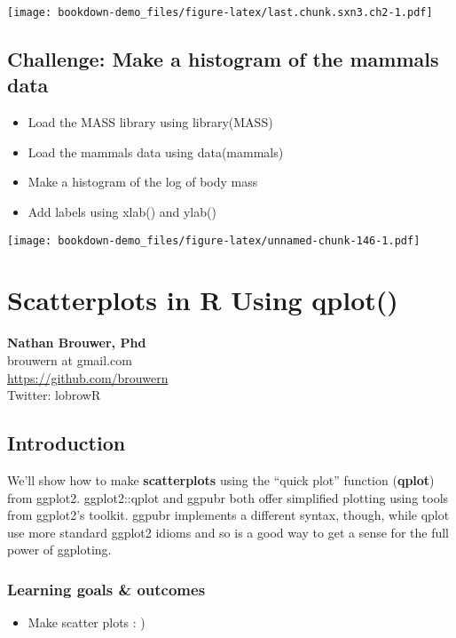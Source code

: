 \documentclass[]{book}
\providecommand{\tightlist}{%
  \setlength{\itemsep}{0pt}\setlength{\parskip}{0pt}}
\theoremstyle{definition}
\theoremstyle{definition}
\theoremstyle{definition}
\theoremstyle{remark}
\begin{document}
\texttt{[image: bookdown-demo\_files/figure-latex/last.chunk.sxn3.ch2-1.pdf]}

\section{Challenge: Make a histogram of the mammals
data}\label{challenge-make-a-histogram-of-the-mammals-data}

\begin{itemize}
\tightlist
\item
  Load the MASS library using library(MASS)
\item
  Load the mammals data using data(mammals)
\item
  Make a histogram of the log of body mass
\item
  Add labels using xlab() and ylab()
\end{itemize}

\texttt{[image: bookdown-demo\_files/figure-latex/unnamed-chunk-146-1.pdf]}

\chapter{Scatterplots in R Using
qplot()}\label{scatterplots-in-r-using-qplot}

\textbf{Nathan Brouwer, Phd}\\
brouwern at gmail.com\\
\url{https://github.com/brouwern}\\
Twitter: lobrowR

\section{Introduction}\label{introduction-7}

We'll show how to make \textbf{scatterplots} using the ``quick plot''
function (\textbf{qplot}) from ggplot2. ggplot2::qplot and ggpubr both
offer simplified plotting using tools from ggplot2's toolkit. ggpubr
implements a different syntax, though, while qplot use more standard
ggplot2 idioms and so is a good way to get a sense for the full power of
ggploting.

\subsection*{Learning goals \&
outcomes}\label{learning-goals-outcomes-2}

\begin{itemize}
\tightlist
\item
  Make scatter plots : )
\end{itemize}
\end{document}
